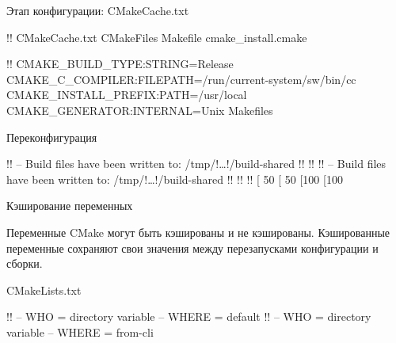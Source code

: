 \documentclass[compress, 8pt, aspectratio=169]{beamer}
\begin{document}
\begin{frame}[fragile]{Этап конфигурации: CMakeCache.txt}

  \begin{terminalwindow}
!!
CMakeCache.txt  CMakeFiles  Makefile  cmake_install.cmake
  \end{terminalwindow}

  \bigbreak

  \begin{terminalwindow}
!!
CMAKE_BUILD_TYPE:STRING=Release
CMAKE_C_COMPILER:FILEPATH=/run/current-system/sw/bin/cc
CMAKE_INSTALL_PREFIX:PATH=/usr/local
CMAKE_GENERATOR:INTERNAL=Unix Makefiles
  \end{terminalwindow}

\end{frame}

\begin{frame}[fragile]{Переконфигурация}

  \begin{terminalwindow}
!!
-- Build files have been written to: /tmp/!\dots!/build-shared
!!
!!
!!
-- Build files have been written to: /tmp/!\dots!/build-shared
!!
!!
!!
[ 50%
[ 50%
[100%
[100%
  \end{terminalwindow}

\end{frame}

\begin{frame}[fragile]{Кэширование переменных}

  Переменные CMake могут быть кэшированы и не кэшированы.
  Кэшированные переменные сохраняют свои значения между
  перезапусками конфигурации и сборки.

  \vspace{0.5em}

    {CMakeLists.txt}

  \begin{terminalwindow}
!!
-- WHO   = directory variable
-- WHERE = default
!!
-- WHO   = directory variable
-- WHERE = from-cli
  \end{terminalwindow}

\end{frame}
\end{document}
